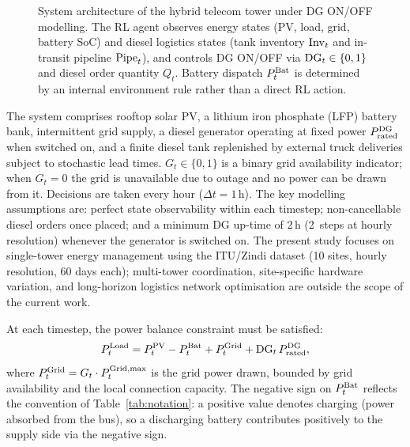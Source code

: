 \begin{figure}[htbp]
{%
}
\caption{System architecture of the hybrid telecom tower under DG ON/OFF
modelling. The RL agent observes energy states (PV, load, grid, battery SoC)
and diesel logistics states (tank inventory $\mathrm{Inv}_t$ and in-transit pipeline
$\mathrm{Pipe}_t$), and controls DG ON/OFF via
$\mathrm{DG}_t \in \{0,1\}$ and diesel order quantity $Q_t$. Battery dispatch
$P_t^{\mathrm{Bat}}$ is determined by an internal environment rule rather than a
direct RL action.}
\label{fig:system_diagram}
\end{figure}

The system comprises rooftop solar PV, a lithium iron phosphate (LFP) battery
bank, intermittent grid supply, a diesel generator operating at fixed power
$P_{\mathrm{rated}}^{\mathrm{DG}}$ when switched on, and a finite diesel tank
replenished by external truck deliveries subject to stochastic lead times.
$G_t \in \{0,1\}$ is a binary grid availability indicator; when $G_t = 0$ the
grid is unavailable due to outage and no power can be drawn from it.
Decisions are taken every hour ($\Delta t = 1$\,h). The key modelling
assumptions are: perfect state observability within each timestep;
non-cancellable diesel orders once placed; and a minimum DG up-time of 2\,h
(2~steps at hourly resolution) whenever the generator is switched on.
The present study focuses on single-tower energy management using the
ITU/Zindi dataset (10 sites, hourly resolution, 60 days each); multi-tower
coordination, site-specific hardware variation, and long-horizon logistics
network optimisation are outside the scope of the current work.

At each timestep, the power balance constraint must be satisfied:
\begin{equation}
P_t^{\mathrm{Load}} = P_t^{\mathrm{PV}} - P_t^{\mathrm{Bat}} + P_t^{\mathrm{Grid}} + \mathrm{DG}_t\,P_{\mathrm{rated}}^{\mathrm{DG}},
\label{eq:balance}
\end{equation}
where $P_t^{\mathrm{Grid}} = G_t \cdot P_t^{\mathrm{Grid},\max}$ is the grid power drawn, bounded
by grid availability and the local connection capacity. The negative sign on
$P_t^{\mathrm{Bat}}$ reflects the convention of Table~\ref{tab:notation}: a positive
value denotes charging (power absorbed from the bus), so a discharging battery
contributes positively to the supply side via the negative sign.

